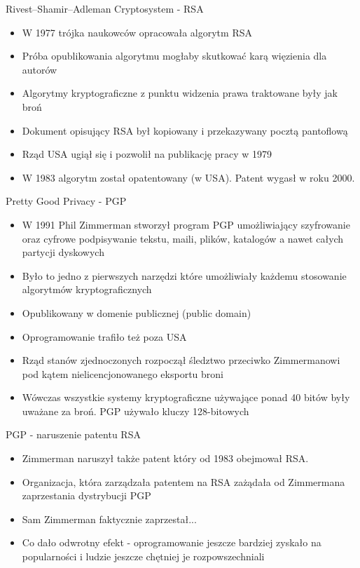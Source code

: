 \documentclass[aspectratio=169]{beamer}
\begin{document}
\begin{frame}{Rivest–Shamir–Adleman Cryptosystem - RSA}
    \begin{itemize}
        \item W 1977 trójka naukowców opracowała algorytm RSA
        \item Próba opublikowania algorytmu mogłaby skutkować karą więzienia dla autorów
        \item Algorytmy kryptograficzne z punktu widzenia prawa traktowane były jak broń
        \item Dokument opisujący RSA był kopiowany i przekazywany pocztą pantoflową
        \item Rząd USA ugiął się i pozwolił na publikację pracy w 1979
        \item W 1983 algorytm został opatentowany (w USA). Patent wygasł w roku 2000.
    \end{itemize}
\end{frame}

\begin{frame}{Pretty Good Privacy - PGP}
    \begin{itemize}
        \item W 1991 Phil Zimmerman stworzył program PGP umożliwiający szyfrowanie oraz cyfrowe podpisywanie tekstu, maili, plików, katalogów a nawet całych partycji dyskowych
        \item Było to jedno z pierwszych narzędzi które umożliwiały każdemu stosowanie algorytmów kryptograficznych
        \item Opublikowany w domenie publicznej (public domain)
        \item Oprogramowanie trafiło też poza USA
        \item Rząd stanów zjednoczonych rozpoczął śledztwo przeciwko Zimmermanowi pod kątem nielicencjonowanego eksportu broni
        \item Wówczas wszystkie systemy kryptograficzne używające ponad 40 bitów były uważane za broń. PGP używało kluczy 128-bitowych
    \end{itemize}
\end{frame}

\begin{frame}{PGP - naruszenie patentu RSA}
    \begin{itemize}
        \item Zimmerman naruszył także patent który od 1983 obejmował RSA.
        \item Organizacja, która zarządzała patentem na RSA zażądała od Zimmermana zaprzestania dystrybucji PGP
        \item Sam Zimmerman faktycznie zaprzestał... 
        \item Co dało odwrotny efekt - oprogramowanie jeszcze bardziej zyskało na popularności i ludzie jeszcze chętniej je rozpowszechniali
    \end{itemize}
\end{frame}
\end{document}
